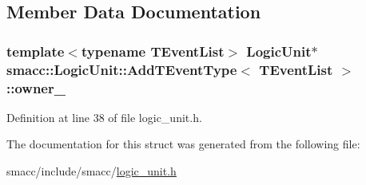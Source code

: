 \subsection{Member Data Documentation}
\subsubsection[{\texorpdfstring{owner\+\_\+}{owner_}}]{\setlength{\rightskip}{0pt plus 5cm}template$<$typename T\+Event\+List$>$ {\bf Logic\+Unit}$\ast$ {\bf smacc\+::\+Logic\+Unit\+::\+Add\+T\+Event\+Type}$<$ T\+Event\+List $>$\+::owner\+\_\+}\hypertarget{structsmacc_1_1LogicUnit_1_1AddTEventType_a6da43b333ecdf77bde453cd289b4d325}{}\label{structsmacc_1_1LogicUnit_1_1AddTEventType_a6da43b333ecdf77bde453cd289b4d325}


Definition at line 38 of file logic\+\_\+unit.\+h.



The documentation for this struct was generated from the following file\+:\begin{DoxyCompactItemize}
\item 
smacc/include/smacc/\hyperlink{logic__unit_8h}{logic\+\_\+unit.\+h}\end{DoxyCompactItemize}
